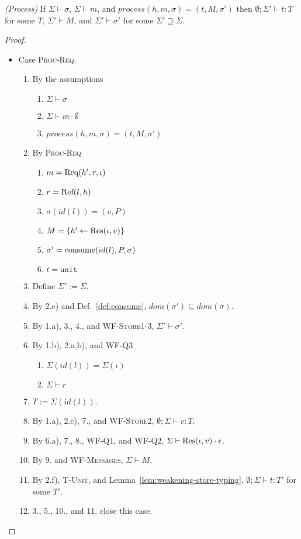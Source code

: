 \begin{lem}\emph{(Process)}\label{lem:process}
If $\Sigma \vdash \sigma$, $\Sigma \vdash m$, and $process(h, m, \sigma) = (t, M, \sigma')$ then $\emptyset ; \Sigma' \vdash t : T$ for some $T$, $\Sigma' \vdash M$, and $\Sigma' \vdash \sigma'$ for some $\Sigma' \supseteq \Sigma$.
\end{lem}
\begin{proof}
\begin{itemize}
\item Case \textsc{Proc-Req}.
\begin{enumerate}
\item By the assumptions
  \begin{enumerate}[label=(\alph*)]
  \item $\Sigma \vdash \sigma$
  \item $\Sigma \vdash m \cdot \emptyset$
  \item $process(h, m, \sigma) = (t, M, \sigma')$
  \end{enumerate}
\item By \textsc{Proc-Req}
  \begin{enumerate}[label=(\alph*)]
  \item $m = {\textrm{Req}(h', r, \iota)}$
  \item $r = {\textrm{Ref}(l, h)}$
  \item $\sigma(id(l)) = (v, P)$
  \item $M = \{ h' \leftarrow {\textrm{Res}(\iota, v)} \}$
  \item $\sigma' = {\textrm{consume}(id(l), P, \sigma)}$
  \item $t = \texttt{unit}$
  \end{enumerate}
\item Define $\Sigma' := \Sigma$.
\item By 2.e) and Def.~\ref{def:consume}, $dom(\sigma') \subseteq dom(\sigma)$.
\item By 1.a), 3., 4., and \textsc{WF-Store1-3}, $\Sigma' \vdash \sigma'$.
\item By 1.b), 2.a,b), and \textsc{WF-Q3}
  \begin{enumerate}[label=(\alph*)]
  \item $\Sigma(id(l)) = \Sigma(\iota)$
  \item $\Sigma \vdash r$
  \end{enumerate}
\item $T := \Sigma(id(l))$.
\item By 1.a), 2.c), 7., and \textsc{WF-Store2}, $\emptyset ; \Sigma \vdash v : T$.
\item By 6.a), 7., 8., \textsc{WF-Q1}, and \textsc{WF-Q2}, $\Sigma \vdash {\textrm{Res}(\iota, v)} \cdot \epsilon$.
\item By 9. and \textsc{WF-Messages}, $\Sigma \vdash M$.
\item By 2.f), \textsc{T-Unit}, and Lemma~\ref{lem:weakening-store-typing}, $\emptyset ; \Sigma \vdash t : T'$ for some $T'$.
\item 3., 5., 10., and 11. close this case.
\end{enumerate}


\end{itemize}
\end{proof}
